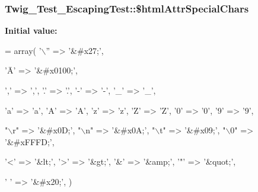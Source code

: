 \subsubsection[{\texorpdfstring{\$html\+Attr\+Special\+Chars}{$htmlAttrSpecialChars}}]{\setlength{\rightskip}{0pt plus 5cm}Twig\+\_\+\+Test\+\_\+\+Escaping\+Test\+::\$html\+Attr\+Special\+Chars\hspace{0.3cm}{\ttfamily [protected]}}\hypertarget{classTwig__Test__EscapingTest_a7613c0830c7f786897600831ac3fa1e0}{}\label{classTwig__Test__EscapingTest_a7613c0830c7f786897600831ac3fa1e0}
{\bfseries Initial value\+:}
\begin{DoxyCode}
= array(
        \textcolor{charliteral}{'\(\backslash\)''} => \textcolor{stringliteral}{'&#x27;'},
        
        \textcolor{stringliteral}{'Ā'} => \textcolor{stringliteral}{'&#x0100;'},
        
        \textcolor{charliteral}{','} => \textcolor{charliteral}{','},
        \textcolor{charliteral}{'.'} => \textcolor{charliteral}{'.'},
        \textcolor{charliteral}{'-'} => \textcolor{charliteral}{'-'},
        \textcolor{charliteral}{'\_'} => \textcolor{charliteral}{'\_'},
        
        \textcolor{charliteral}{'a'} => \textcolor{charliteral}{'a'},
        \textcolor{charliteral}{'A'} => \textcolor{charliteral}{'A'},
        \textcolor{charliteral}{'z'} => \textcolor{charliteral}{'z'},
        \textcolor{charliteral}{'Z'} => \textcolor{charliteral}{'Z'},
        \textcolor{charliteral}{'0'} => \textcolor{charliteral}{'0'},
        \textcolor{charliteral}{'9'} => \textcolor{charliteral}{'9'},
        
        \textcolor{stringliteral}{"\(\backslash\)r"} => \textcolor{stringliteral}{'&#x0D;'},
        \textcolor{stringliteral}{"\(\backslash\)n"} => \textcolor{stringliteral}{'&#x0A;'},
        \textcolor{stringliteral}{"\(\backslash\)t"} => \textcolor{stringliteral}{'&#x09;'},
        \textcolor{stringliteral}{"\(\backslash\)0"} => \textcolor{stringliteral}{'&#xFFFD;'}, 
        
        \textcolor{charliteral}{'<'} => \textcolor{stringliteral}{'&lt;'},
        \textcolor{charliteral}{'>'} => \textcolor{stringliteral}{'&gt;'},
        \textcolor{charliteral}{'&'} => \textcolor{stringliteral}{'&amp;'},
        \textcolor{charliteral}{'"'} => \textcolor{stringliteral}{'&quot;'},
        
        \textcolor{charliteral}{' '} => \textcolor{stringliteral}{'&#x20;'},
    )
\end{DoxyCode}
